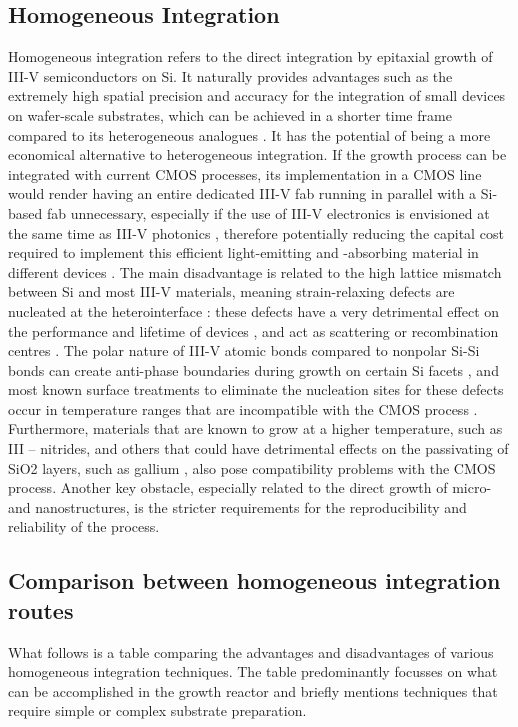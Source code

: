 \subsection{Homogeneous Integration}
Homogeneous integration refers to the direct integration by epitaxial growth of III-V semiconductors on Si. 
It naturally provides advantages such as the extremely high spatial precision and accuracy for the integration of small devices on wafer-scale substrates, which can be achieved in a shorter time frame compared to its heterogeneous analogues \cite{Wang2017}. It has the potential of being a more economical alternative to heterogeneous integration. If the growth process can be integrated with current CMOS processes, its implementation in a CMOS line would render having an entire dedicated III-V fab running in parallel with a Si-based fab unnecessary, especially if the use of III-V electronics is envisioned at the same time as III-V photonics \cite{Wang2017}, therefore potentially reducing the capital cost required to implement this efficient light-emitting and -absorbing material in different devices \cite{Tang2019}.
The main disadvantage is related to the high lattice mismatch between Si and most III-V materials, meaning strain-relaxing defects are nucleated at the heterointerface \cite{Kunert2018}: these defects have a very detrimental effect on the performance and lifetime of devices \cite{Mahajan2000, Zenari2021}, and act as scattering or recombination centres \cite{Jeon2015}. The polar nature of III-V atomic bonds compared to nonpolar Si-Si bonds can create anti-phase boundaries during growth on certain Si facets \cite{Kunert2018}, and most known surface treatments to eliminate the nucleation sites for these defects occur in temperature ranges that are incompatible with the CMOS process \cite{Miller2000}. Furthermore, materials that are known to grow at a higher temperature, such as III – nitrides, and others that could have detrimental effects on the passivating of SiO2 layers, such as gallium \cite{Miller2000}, also pose compatibility problems with the CMOS process. Another key obstacle, especially related to the direct growth of micro- and nanostructures, is the stricter requirements for the reproducibility and reliability of the process.
\subsection{Comparison between homogeneous integration routes}
What follows is a table comparing the advantages and disadvantages of various homogeneous integration techniques. The table predominantly focusses on what can be accomplished in the growth reactor and briefly mentions techniques that require simple or complex substrate preparation.


